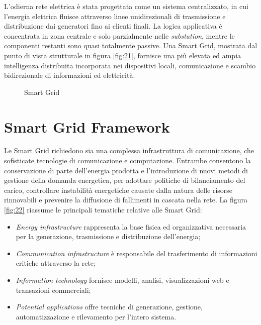 L'odierna rete elettrica è stata progettata come un sistema centralizzato, in cui l'energia elettrica fluisce attraverso linee unidirezionali di trasmissione e distribuzione dai generatori fino ai clienti finali. La logica applicativa è concentrata in zona centrale e solo parzialmente nelle \emph{substation}, mentre le componenti restanti sono quasi totalmente passive. Una Smart Grid, mostrata dal punto di vista strutturale in figura \ref{fig:21}, fornisce una più elevata ed ampia intelligenza distribuita incorporata nei dispositivi locali, comunicazione e scambio bidirezionale di informazioni ed elettricità.

\begin{figure}[h] 
\caption{Smart Grid}\label{fig:2_1}
\end{figure}

\section{Smart Grid Framework}
Le Smart Grid richiedono sia una complessa infrastruttura di comunicazione, che sofisticate tecnologie di comunicazione e computazione. Entrambe consentono la conservazione di parte dell'energia prodotta e l'introduzione di nuovi metodi di gestione della domanda energetica, per adottare politiche di bilanciamento del carico, controllare instabilità energetiche causate dalla natura delle risorse rinnovabili e prevenire la diffusione di fallimenti in cascata nella rete. 
\newline 
La figura \ref{fig:22} riassume le principali tematiche relative alle Smart Grid:
\begin{itemize}
	\item \emph{Energy infrastructure} rappresenta la base fisica ed organizzativa necessaria per la generazione, trasmissione e distribuzione dell'energia;
	\item \emph{Communication infrastructure} è responsabile del trasferimento di informazioni critiche attraverso la rete;
	\item \emph{Information technology} fornisce modelli, analisi, visualizzazioni web e transazioni commerciali;
	\item \emph{Potential applications} offre tecniche di generazione, gestione, automatizzazione e rilevamento per l'intero sistema.
\end{itemize} 

